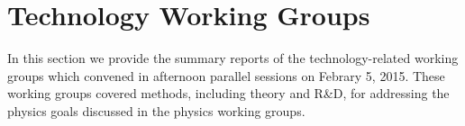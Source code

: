 \section{Technology Working Groups}
\label{sec:TechnologyWG}

In this section we provide the summary reports of the
technology-related working groups which convened in afternoon
parallel sessions on Febrary 5, 2015. These working groups covered
methods, including theory and R&D, for addressing the physics goals
discussed in the physics working groups.


